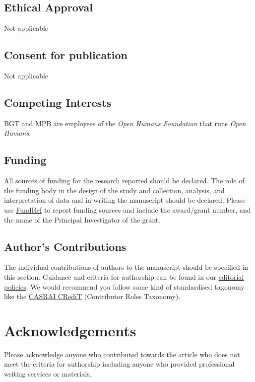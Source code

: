 \documentclass[a4paper,num-refs]{oup-contemporary}
\begin{document}
\subsection{Ethical Approval}

Not applicable

\subsection{Consent for publication}
Not applicable

\subsection{Competing Interests}

BGT and MPB are employees of the \textit{Open Humans Foundation} that runs \textit{Open Humans}.


\subsection{Funding}

All sources of funding for the research reported should be declared. The role of the funding body in the design of the study and collection, analysis, and interpretation of data and in writing the manuscript should be declared. Please use \href{http://www.crossref.org/fundingdata/}{FundRef} to report funding sources and include the award/grant number, and the name of the Principal Investigator of the grant. 


\subsection{Author's Contributions}

The individual contributions of authors to the manuscript should be specified in this section. Guidance and criteria for authorship can be found in our \href{https://academic.oup.com/gigascience/pages/editorial_policies_and_reporting_standards}{editorial policies}. We would recommend you follow some kind of standardised taxonomy like the \href{http://docs.casrai.org/CRediT}{CASRAI CRediT} (Contributor Roles Taxonomy).


\section{Acknowledgements}

Please acknowledge anyone who contributed towards the article who does not meet the criteria for authorship including anyone who provided professional writing services or materials.
\end{document}
